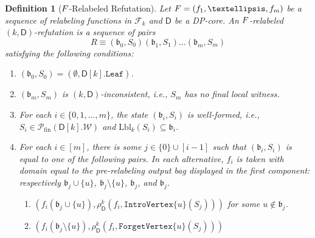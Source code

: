 \documentclass[10pt,a4paper]{amsart}
\newtheorem{definition}{Definition}
\newcommand{\abag}{\mathfrak{b}}
\newcommand{\action}{\rho}
\newcommand{\allwitnesses}{\mathcal{W}}
\newcommand{\dpcore}{\mathsf{D}}
\newcommand{\dprefutation}{R}
\newcommand{\finitepowerset}[1]{\mathcal{P}_{\mathrm{fin}}(#1)}
\newcommand{\forgetvertextype}[1]{\mathtt{ForgetVertex}\{#1\}}
\newcommand{\initialsetgeneric}{\mathtt{Leaf}}
\newcommand{\introvertextype}[1]{\mathtt{IntroVertex}\{#1\}}
\newcommand{\relabelclass}{\mathcal{F}}
\newcommand{\relabelingfunction}{f}
\newcommand{\relabelsequence}{\textsc{F}}
\newcommand{\treewidthvalue}{k}
\newcommand{\vertexone}{u}
\newcommand{\witnessset}{S}
\begin{document}
\begin{definition}[$\relabelsequence$-Relabeled Refutation]\label{definition:RelabeledRefutation}
Let $\relabelsequence = (\relabelingfunction_1,\dots,\relabelingfunction_m)$ be a sequence of relabeling functions in $\relabelclass_\treewidthvalue$ and $\dpcore$ be a DP-core. An $\relabelsequence$-relabeled $(\treewidthvalue,\dpcore)$-refutation is a sequence of pairs
$$\dprefutation \equiv (\abag_0,\witnessset_0)(\abag_1,\witnessset_1)\dots (\abag_m,\witnessset_m)$$ satisfying the following conditions:
\begin{enumerate}
\setlength\itemsep{0.5em}
\item \label{sequence-relabeling-condition-one}
$(\abag_0,\witnessset_0) = (\emptyset,\dpcore[\treewidthvalue].\initialsetgeneric)$.
\item \label{sequence-relabeling-condition-two}
$(\abag_m,\witnessset_m)$ is $(\treewidthvalue,\dpcore)$-inconsistent, i.e., $\witnessset_m$ has no final local witness.
	\item \label{sequence-relabeling-condition-wellformed}
	For each $i\in\{0,1,\dots,m\}$, the state $(\abag_i,\witnessset_i)$ is well-formed, i.e., $\witnessset_i\in \finitepowerset{\dpcore[\treewidthvalue].\allwitnesses}$ and $\mathrm{Lbl}_{\treewidthvalue}(\witnessset_i)\subseteq \abag_i$.
					\item \label{sequence-relabeling-condition-three}
					For each $i\in [m]$, there is some $j\in \{0\}\cup[i-1]$ such that $(\abag_i,\witnessset_i)$ is equal to one of the following pairs.
					In each alternative, $\relabelingfunction_i$ is taken with domain equal to the pre-relabeling output bag displayed in the first component: respectively $\abag_j\cup\{\vertexone\}$, $\abag_j\setminus\{\vertexone\}$, $\abag_j$, and $\abag_j$.
				\begin{enumerate}
	\item \label{sequence-relabeling-IntroVertex}
	$(\relabelingfunction_i(\abag_j\cup \{\vertexone\}), \action_{\dpcore}^{\treewidthvalue}(\relabelingfunction_i,\introvertextype{\vertexone}(\witnessset_j)))$
for some $\vertexone\notin \abag_j$.
\item \label{sequence-relabeling-ForgetVertex}
$(\relabelingfunction_i(\abag_j\setminus \{\vertexone\}), \action_{\dpcore}^{\treewidthvalue}(\relabelingfunction_i,\forgetvertextype{\vertexone}(\witnessset_j)))$

\end{enumerate}
\end{enumerate}
\end{definition}
\end{document}
